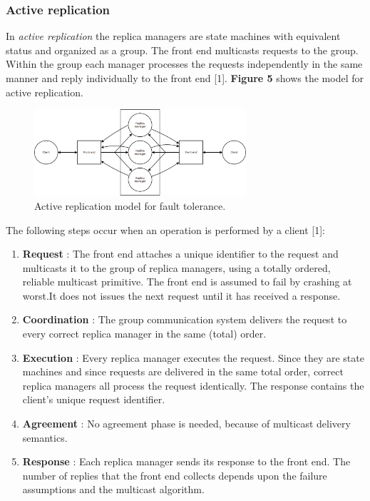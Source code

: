 \subsubsection{Active replication}

In \emph{active replication} the replica managers are state machines with equivalent status and organized as a group. The front end multicasts requests to the group. Within the group each manager processes the requests independently in the same manner and reply individually to the front end [1]. \textbf{Figure 5} shows the model for active replication.

\begin{figure}
	\begin{center}
		\includegraphics[width=0.7\textwidth]{img/activereplication}
	\end{center}
	\caption{Active replication model for fault tolerance.}
	\label{fig:activereplication}
\end{figure}


The following steps occur when an operation is performed by a client [1]:
\begin{enumerate}
	\item \textbf{Request} : The front end attaches a unique identifier to the request and multicasts it to the group of replica managers, using a totally ordered, reliable multicast primitive. The front end is assumed to fail by crashing at worst.It does not issues the next request until it has received a response.
	\item \textbf{Coordination} : The group communication system delivers the request to every correct replica manager in the same (total) order.
	\item \textbf{Execution} : Every replica manager executes the request. Since they are state machines and since requests are delivered in the same total order, correct replica managers all process the request identically. The response contains the client's unique request identifier.
	\item \textbf{Agreement} : No agreement phase is needed, because of multicast delivery semantics.
	\item \textbf{Response} : Each replica manager sends its response to the front end. The number of replies that the front end collects depends upon the failure assumptions and the multicast algorithm.
\end{enumerate}

